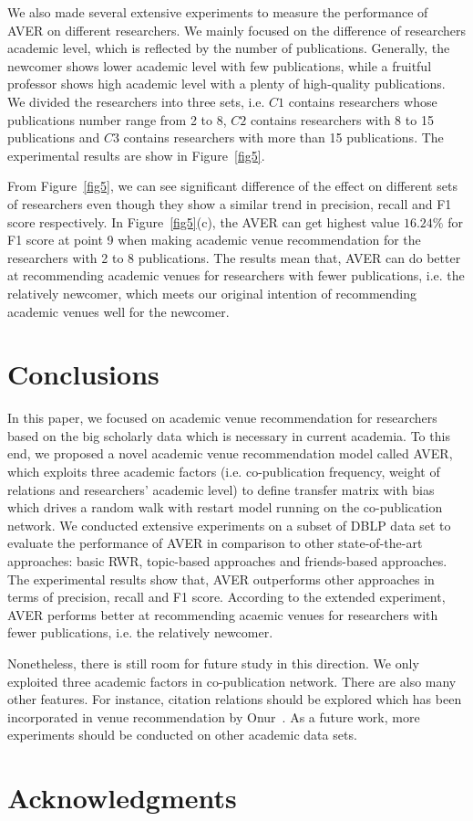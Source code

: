 \documentclass[9pt]{acm_proc_article-sp}
\begin{document}
We also made several extensive experiments to measure the performance of AVER on different researchers. We mainly focused on the difference of researchers academic level, which is reflected by the number of publications. Generally, the newcomer shows lower academic level with few publications, while a fruitful professor shows high academic level with a plenty of high-quality publications. We divided the researchers into three sets, i.e. $C1$ contains researchers whose publications number range from 2 to 8, $C2$ contains researchers with 8 to 15 publications and $C3$ contains researchers with more than 15 publications. The experimental results are show in Figure~\ref{fig5}.

From Figure~\ref{fig5}, we can see significant difference of the effect on different sets of researchers even though they show a similar trend in precision, recall and F1 score respectively. In Figure~\ref{fig5}(c), the AVER can get highest value $16.24\%$ for F1 score at point 9 when making academic venue recommendation for the researchers with 2 to 8 publications. The results mean that, AVER can do better at recommending academic venues for researchers with fewer publications, i.e. the relatively newcomer, which meets our original intention of recommending academic venues well for the newcomer.

\section{Conclusions}
In this paper, we focused on academic venue recommendation for researchers based on the big scholarly data which is necessary in current academia. To this end, we proposed a novel academic venue recommendation model called AVER, which exploits three academic factors (i.e. co-publication frequency, weight of relations and researchers' academic level) to define transfer matrix with bias which drives a random walk with restart model running on the co-publication network. We conducted extensive experiments on a subset of DBLP data set to evaluate the performance of AVER in comparison to other state-of-the-art approaches: basic RWR, topic-based approaches and friends-based approaches. The experimental results show that, AVER outperforms other approaches in terms of precision, recall and F1 score. According to the extended experiment, AVER performs better at recommending acaemic venues for researchers with fewer publications, i.e. the relatively newcomer.

Nonetheless, there is still room for future study in this direction. We only exploited three academic factors in co-publication network. There are also many other features. For instance, citation relations should be explored which has been incorporated in venue recommendation by Onur~\cite{kuccuktuncc2012recommendation}. As a future work, more experiments should be conducted on other academic data sets.

\section{Acknowledgments}




\balancecolumns
\end{document}
